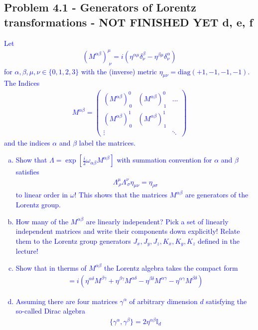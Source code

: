 \documentclass[../main.tex]{subfiles}
\begin{document}
\subsection{Problem 4.1 - Generators of Lorentz transformations - NOT FINISHED YET d, e, f}
\textcolor{blue}{
Let
\begin{align}
(M^{\alpha\beta})^\mu_{\;\nu}=i(\eta^{\alpha\mu}\delta^\beta_\nu-\eta^{\beta\mu}\delta^\alpha_\nu)
\end{align}
for $\alpha,\beta,\mu,\nu \in\{0,1,2,3\}$ with the (inverse) metric $\eta_{\mu\nu}=\text{diag}(+1,-1,-1,-1)$. The Indices
\begin{align}
M^{\alpha\beta}=\left(
\begin{matrix}
(M^{\alpha\beta})^0_{\,0} & (M^{\alpha\beta})^0_{\,1} & ...\\
(M^{\alpha\beta})^1_{\,0} & (M^{\alpha\beta})^1_{\,1} & \\
\vdots & & \ddots
\end{matrix}
\right)
\end{align}
and the indices $\alpha$ and $\beta$ label the matrices.
\begin{enumerate}[(a)]
\item Show that $\Lambda=\exp[\frac{i}{2}\omega_{\alpha\beta} M^{\alpha\beta}]$ with summation convention for $\alpha$ and $\beta$ satisfies
\begin{align}
\Lambda^\mu_{\,\rho}\Lambda^\nu_{\,\sigma}\eta_{\mu\nu}=\eta_{\rho\sigma}
\end{align}
to linear order in $\omega$! This shows that the matrices $M^{\alpha\beta}$ are  generators of the Lorentz group.
\item How many of the $M^{\alpha\beta}$ are linearly independent? Pick a set of linearly independent matrices and write their components down explicitly! Relate them to the Lorentz group generators $J_x,J_y,J_z,K_x,K_y,K_z$ defined in the lecture!
\item Show that in therms of $M^{\alpha\beta}$ the Lorentz algebra takes the compact form
\begin{align}
[M^{\alpha\beta},M^{\gamma\delta}]=i(
\eta^{\alpha\delta}M^{\beta\gamma}+
\eta^{\beta\gamma}M^{\alpha\delta}-
\eta^{\beta\delta}M^{\alpha\gamma}-
\eta^{\alpha\gamma}M^{\beta\delta}
)\label{Klose41a}
\end{align}
\item Assuming there are four matrices $\gamma^\alpha$ of arbitrary dimension $d$ satisfying the so-called Dirac algebra
\begin{align}
\{\gamma^\alpha,\gamma^\beta\}=2\eta^{\alpha\beta}\mathbb{I}_d

\end{align}
\end{enumerate}}
\end{document}
